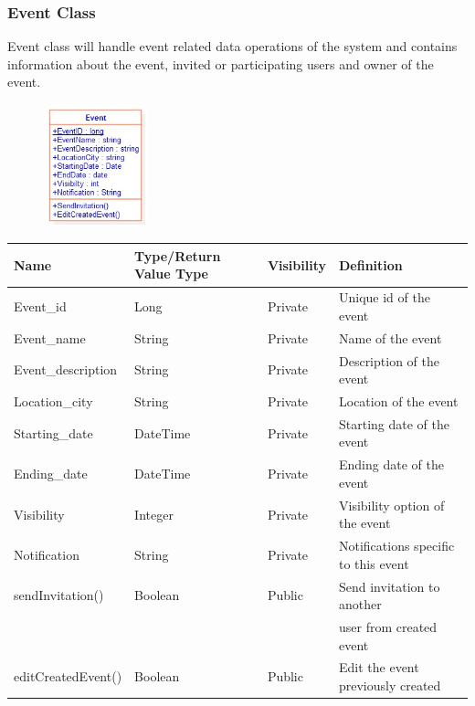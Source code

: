 \subsubsection{Event Class}
\par Event class will handle event related data operations of the system and contains information about the event, invited or participating users and owner of the event.
\begin{figure}[tbh]
  \begin{center}
  \includegraphics[width=30mm]{eventclass}
  \end{center}
\end{figure}

\begin{tabular}{|l|l|l|l|}
  \hline
  \textbf{Name} & \textbf{Type/Return Value Type} & \textbf{Visibility} & \textbf{Definition} \\
  \hline
  Event\_id & Long & Private & Unique id of the event \\
  \hline
  Event\_name & String & Private & Name of the event \\
  \hline
  Event\_description & String & Private & Description of the event \\
  \hline
  Location\_city & String & Private & Location of the event \\
  \hline
  Starting\_date & DateTime & Private & Starting date of the event \\
  \hline
  Ending\_date & DateTime & Private & Ending date of the event \\
  \hline
  Visibility & Integer & Private & Visibility option of the event \\
  \hline
  Notification & String & Private & Notifications specific to this event \\
  \hline
  sendInvitation() & Boolean & Public & Send invitation to another \\
  & & & user from created event \\
  \hline
  editCreatedEvent() & Boolean & Public & Edit the event previously created \\
  \hline
\end{tabular}

